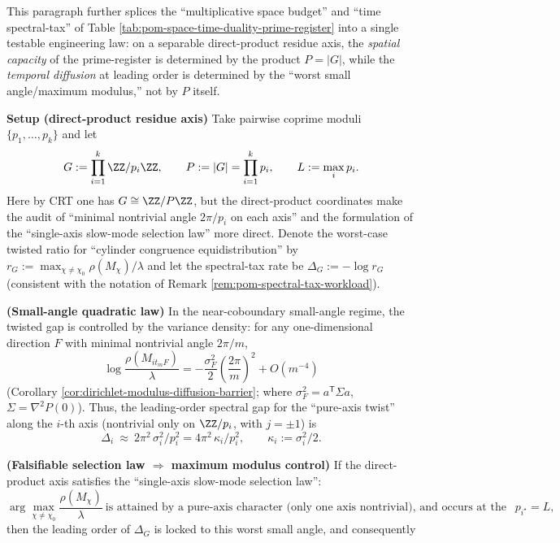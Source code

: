 \begin{remark}\label{rem:pom-max-modulus-control-law}
This paragraph further splices the ``multiplicative space budget'' and ``time spectral-tax'' of Table \ref{tab:pom-space-time-duality-prime-register} into a single testable engineering law: on a separable direct-product residue axis, the \emph{spatial capacity} of the prime-register is determined by the product \(P=|G|\), while the \emph{temporal diffusion} at leading order is determined by the ``worst small angle/maximum modulus,'' not by \(P\) itself.
\par
\medskip\noindent\textbf{Setup (direct-product residue axis)}
Take pairwise coprime moduli \(\{p_1,\dots,p_k\}\) and let
\[
G:=\prod_{i=1}^k\ZZ/p_i\ZZ,
\qquad
P:=|G|=\prod_{i=1}^k p_i,
\qquad
L:=\max_i p_i.
\]
Here by CRT one has \(G\cong \ZZ/P\ZZ\), but the direct-product coordinates make the audit of ``minimal nontrivial angle \(2\pi/p_i\) on each axis'' and the formulation of the ``single-axis slow-mode selection law'' more direct.
Denote the worst-case twisted ratio for ``cylinder congruence equidistribution'' by
\(
r_G:=\max_{\chi\neq\chi_0}\rho(M_\chi)/\lambda
\)
and let the spectral-tax rate be
\(
\Delta_G:=-\log r_G
\)
(consistent with the notation of Remark \ref{rem:pom-spectral-tax-workload}).
\par
\medskip\noindent\textbf{(Small-angle quadratic law)}
In the near-coboundary small-angle regime, the twisted gap is controlled by the variance density: for any one-dimensional direction \(F\) with minimal nontrivial angle \(2\pi/m\),
\[
\log\frac{\rho(M_{it_mF})}{\lambda}
=-\frac{\sigma_F^2}{2}\left(\frac{2\pi}{m}\right)^2+O(m^{-4})
\]
(Corollary \ref{cor:dirichlet-modulus-diffusion-barrier}; where \(\sigma_F^2=a^{\mathsf T}\Sigma a\), \(\Sigma=\nabla^2P(0)\)).
Thus, the leading-order spectral gap for the ``pure-axis twist'' along the \(i\)-th axis (nontrivial only on \(\ZZ/p_i\), with \(j=\pm1\)) is
\[
\Delta_i\ \approx\ 2\pi^2\,\sigma_i^2/p_i^2
=4\pi^2\,\kappa_i/p_i^2,
\qquad \kappa_i:=\sigma_i^2/2.
\]
\par
\medskip\noindent\textbf{(Falsifiable selection law \(\Rightarrow\) maximum modulus control)}
If the direct-product axis satisfies the ``single-axis slow-mode selection law'':
\[
\arg\max_{\chi\neq\chi_0}\frac{\rho(M_\chi)}{\lambda}
\ \text{is attained by a pure-axis character (only one axis nontrivial), and occurs at the largest modulus }p_{i^\star}=L,
\]
then the leading order of \(\Delta_G\) is locked to this worst small angle, and consequently

\end{remark}
